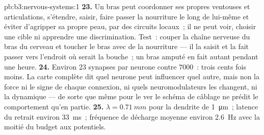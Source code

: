 \begin{solution}{pb:b3:nervous-systems:1}
\textbf{23.} Un bras peut coordonner ses propres ventouses et
articulations, s'étendre, saisir, faire passer la nourriture le long de
lui-même et éviter d'agripper sa propre peau, par des circuits locaux~;
il ne peut voir, choisir une cible ni apprendre une discrimination.
Test~: couper la chaîne nerveuse du bras du cerveau et toucher le bras
avec de la nourriture --- il la saisit et la fait passer vers l'endroit
où serait la bouche~; un bras amputé en fait autant pendant une heure.
\textbf{24.} Environ $23$ synapses par neurone contre $7000$~: trois
cents fois moins. La carte complète dit quel neurone peut influencer
quel autre, mais non la force ni le signe de chaque connexion, ni quels
neuromodulateurs les changent, ni la dynamique --- de sorte que même
pour le ver le schéma de câblage ne prédit le comportement qu'en partie.
\textbf{25.} $\lambda = \qty{0.71}{mm}$ pour la dendrite de
\qty{1}{\micro m}~; latence du retrait environ \qty{33}{ms}~; fréquence
de décharge moyenne environ \qty{2.6}{Hz} avec la moitié du budget aux
potentiels.
\end{solution}
